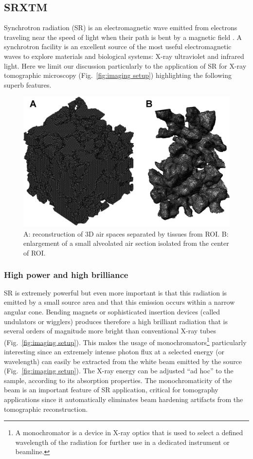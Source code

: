 \subsection{SRXTM}
Synchrotron radiation (SR) is an electromagnetic wave emitted from electrons traveling near the speed of light when their path is bent by a magnetic field \cite{Iida2003}. A synchrotron facility is an excellent source of the most useful electromagnetic waves to explore materials and biological systems: X-ray ultraviolet and infrared light. Here we limit our discussion particularly to the application of SR for X-ray tomographic microscopy (Fig.~\ref{fig:imaging setup}) highlighting the following superb features.

\begin{figure}[htb]
	\centering
	\includegraphics[width=\imsize]{img/Tsuda2008/Tsuda-09}
	\caption{A: reconstruction of 3D air spaces separated by tissues from ROI. B: enlargement of a small alveolated air section isolated from the center of ROI.}
	\label{fig:3dalveolated}
\end{figure}

\subsubsection{High power and high brilliance}
SR is extremely powerful but even more important is that this radiation is emitted by a small source area and that this emission occurs within a narrow angular cone. Bending magnets or sophisticated insertion devices (called undulators or wigglers) produces therefore a high brilliant radiation that is several orders of magnitude more bright than conventional X-ray tubes (Fig.~\ref{fig:imaging setup}). This makes the usage of monochromators\footnote{A monochromator is a device in X-ray optics that is used to select a defined wavelength of the radiation for further use in a dedicated instrument or beamline.} particularly interesting since an extremely intense photon flux at a selected energy (or wavelength) can easily be extracted from the white beam emitted by the source (Fig.~\ref{fig:imaging setup}). The X-ray energy can be adjusted ``ad hoc'' to the sample, according to its absorption properties. The monochromaticity of the beam is an important feature of SR application, critical for tomography applications since it automatically eliminates beam hardening artifacts from the tomographic reconstruction.

